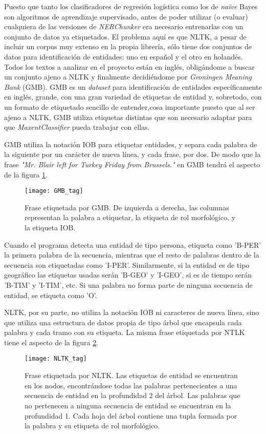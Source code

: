 \documentclass{pre-tfg}
\begin{document}
Puesto que tanto los clasificadores de regresión logística como los de \textit{naïve} Bayes son algoritmos de aprendizaje supervisado, antes de poder utilizar (o evaluar) cualquiera de las versiones de \textit{NERChunker} era necesario entrenarlas con un conjunto de datos ya etiquetados. El problema aquí es que NLTK, a pesar de incluir un corpus muy extenso en la propia librería, sólo tiene dos conjuntos de datos para identificación de entidades: uno en español y el otro en holandés. Todos los textos a analizar en el proyecto están en inglés, obligándome a buscar un conjunto ajeno a NLTK y finalmente decidiéndome por \textit{Groningen Meaning Bank} (GMB). GMB es un \textit{dataset} para identificación de entidades específicamente en inglés, grande, con una gran variedad de etiquetas de entidad y, sobretodo, con un formato de etiquetado sencillo de entender,cosa importante puesto que al ser ajeno a NLTK, GMB utiliza etiquetas distintas que son necesario adaptar para que \textit{MaxentClassifier} pueda trabajar con ellas.

GMB utiliza la notación IOB para etiquetar entidades, y separa cada palabra de la siguiente por un carácter de nueva línea, y cada frase, por dos. De modo que la frase \textit{"Mr. Blair left for Turkey Friday from Brussels."} en GMB tendrá el aspecto de la figura \ref{fig:tags1}.

\begin{figure}[h]
	\texttt{[image: GMB\_tag]}
	\caption{Frase etiquetada por GMB. De izquierda a derecha, las columnas representan la palabra a etiquetar, la etiqueta de rol morfológico, y la etiqueta IOB.}
	\label{fig:tags1}
	\centering
\end{figure}

Cuando el programa detecta una entidad de tipo persona, etiqueta como 'B-PER' la primera palabra de la secuencia, mientras que el resto de palabras dentro de la secuencia son etiquetadas como 'I-PER'. Similarmente, si la entidad es de tipo geográfico las etiquetas usadas serán 'B-GEO' y 'I-GEO', si es de tiempo serán 'B-TIM' y 'I-TIM', etc. Si una palabra no forma parte de ninguna secuencia de entidad, se etiqueta como 'O'.

NLTK, por su parte, no utiliza la notación IOB  ni caracteres de nueva línea, sino que utiliza una estructura de datos propia de tipo árbol que encapsula cada palabra y cada tramo con su etiqueta. La misma frase etiquetada por NTLK tiene el aspecto de la figura \ref{fig:tags2}.

\begin{figure}[h]
	\texttt{[image: NLTK\_tag]}
	\caption{Frase etiquetada por NLTK. Las etiquetas de entidad se encuentran en los nodos, encontrándose todas las palabras pertenecientes a una secuencia de entidad en la profundidad 2 del árbol. Las palabras que no pertenecen a ninguna secuencia de entidad se encuentran en la profundidad 1. Cada hoja del árbol contiene una tupla formada por la palabra y su etiqueta de rol morfológico.}
	\label{fig:tags2}
	\centering
\end{figure}
\end{document}
